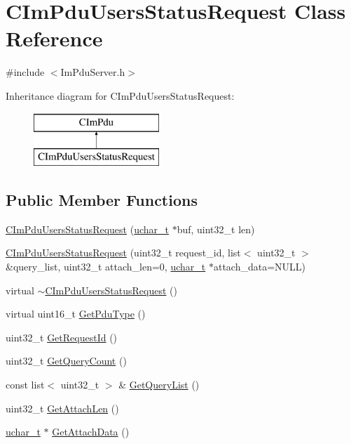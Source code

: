 \hypertarget{class_c_im_pdu_users_status_request}{}\section{C\+Im\+Pdu\+Users\+Status\+Request Class Reference}
\label{class_c_im_pdu_users_status_request}


{\ttfamily \#include $<$Im\+Pdu\+Server.\+h$>$}

Inheritance diagram for C\+Im\+Pdu\+Users\+Status\+Request\+:\begin{figure}[H]
\begin{center}
\leavevmode
\includegraphics[height=2.000000cm]{class_c_im_pdu_users_status_request}
\end{center}
\end{figure}
\subsection*{Public Member Functions}
\begin{DoxyCompactItemize}
\item 
\hyperlink{class_c_im_pdu_users_status_request_a60948ad295816902a6df0f15243ca9ed}{C\+Im\+Pdu\+Users\+Status\+Request} (\hyperlink{base_2ostype_8h_a124ea0f8f4a23a0a286b5582137f0b8d}{uchar\+\_\+t} $\ast$buf, uint32\+\_\+t len)
\item 
\hyperlink{class_c_im_pdu_users_status_request_ac1d1b98192b018897466b2f4cee18d42}{C\+Im\+Pdu\+Users\+Status\+Request} (uint32\+\_\+t request\+\_\+id, list$<$ uint32\+\_\+t $>$ \&query\+\_\+list, uint32\+\_\+t attach\+\_\+len=0, \hyperlink{base_2ostype_8h_a124ea0f8f4a23a0a286b5582137f0b8d}{uchar\+\_\+t} $\ast$attach\+\_\+data=N\+U\+L\+L)
\item 
virtual \hyperlink{class_c_im_pdu_users_status_request_a2f770e333a572c865a838ac0620996c7}{$\sim$\+C\+Im\+Pdu\+Users\+Status\+Request} ()
\item 
virtual uint16\+\_\+t \hyperlink{class_c_im_pdu_users_status_request_a30d94365960e7ceb6346617a18225c33}{Get\+Pdu\+Type} ()
\item 
uint32\+\_\+t \hyperlink{class_c_im_pdu_users_status_request_a9de45c53a951b9f34fd78f709f7d1ea7}{Get\+Request\+Id} ()
\item 
uint32\+\_\+t \hyperlink{class_c_im_pdu_users_status_request_aeb777a3af9c1a849426965cb31129dbb}{Get\+Query\+Count} ()
\item 
const list$<$ uint32\+\_\+t $>$ \& \hyperlink{class_c_im_pdu_users_status_request_a5cf7aeb36a6ef00bddbdbef04f013304}{Get\+Query\+List} ()
\item 
uint32\+\_\+t \hyperlink{class_c_im_pdu_users_status_request_abd60b60301599bbef983945f95573773}{Get\+Attach\+Len} ()
\item 
\hyperlink{base_2ostype_8h_a124ea0f8f4a23a0a286b5582137f0b8d}{uchar\+\_\+t} $\ast$ \hyperlink{class_c_im_pdu_users_status_request_abdda6bbf6813c891f5f5af20be6e649e}{Get\+Attach\+Data} ()
\end{DoxyCompactItemize}
